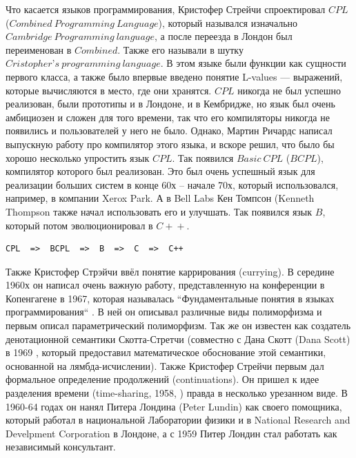 \documentclass[14pt]{matmex-diploma-custom}
\begin{document}
Что касается языков программирования, Кристофер Стрейчи спроектировал $C\!PL$ ($Combined\ Programming\ Language$), который назывался изначально 
$Cambridge\ Programming\ language$, а после переезда в Лондон был переименован в $Combined$. Также его называли в шутку $Cristopher’s\ programming\ language$. В этом языке были функции как сущности первого класса, а также было впервые введено понятие L-values --- выражений, которые вычисляются в место, где они хранятся. $CPL$ никогда не был успешно реализован, были прототипы и в Лондоне, и в Кембридже, но язык был очень амбициозен и сложен для того времени, так что его компиляторы никогда не появились и пользователей у него не было. Однако, Мартин Ричардс написал выпускную работу про компилятор этого языка, и вскоре решил, что было бы хорошо несколько упростить язык $CPL$. Так появился $Basic\ CPL$ ($BCPL$)\cite{bcpl1}, компилятор которого был реализован. Это был очень успешный язык для реализации больших систем в конце 60х -- начале 70х, который использовался, например, в компании Xerox Park. А в Bell Labs Кен Томпсон (Kenneth Thompson также начал использовать его и улучшать. Так появился язык $B$, который потом эволюционировал в $C\!+\!+$.

\begin{verbatim}
CPL  =>  BCPL  =>  B  =>  C  =>  C++
\end{verbatim}

Также Кристофер Стрэйчи ввёл понятие каррирования (currying). В середине 1960х он написал очень важную работу, представленную на конференции в Копенгагене в 1967, которая называлась  “Фундаментальные понятия в языках программирования“ \cite{strachey1}. В ней он описывал различные виды полиморфизма и первым описал параметрический полиморфизм. Так же он известен как создатель денотационной семантики Скотта-Стретчи (совместно с Дана Скотт (Dana Scott) в 1969 \cite{scott1}, который предоставил математическое обоснование этой семантики, основанной на лямбда-исчислении). Также Кристофер Стрейчи первым дал формальное определение продолжений (continuations). Он пришел к идее разделения времени (time-sharing, 1958, \cite{strachey2}) правда в несколько урезанном виде. В 1960-64 годах он нанял Питера Лондина (Peter Lundin) как своего помощника, который работал в национальной Лаборатории физики и в National Research and Develpment Corporation в Лондоне, а с 1959 Питер Лондин стал работать как независимый консультант. 
\end{document}
